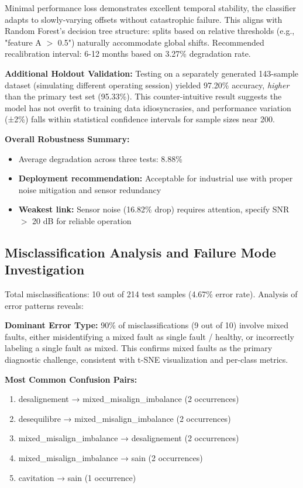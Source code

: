 \documentclass[11pt,a4paper]{article}
\begin{document}
Minimal performance loss demonstrates excellent temporal stability, the classifier adapts to slowly-varying offsets without catastrophic failure. This aligns with Random Forest's decision tree structure: splits based on relative thresholds (e.g., "feature A  $>$  0.5") naturally accommodate global shifts. Recommended recalibration interval: 6-12 months based on 3.27\% degradation rate.

\textbf{Additional Holdout Validation:} Testing on a separately generated 143-sample dataset (simulating different operating session) yielded 97.20\% accuracy, \textit{higher} than the primary test set (95.33\%). This counter-intuitive result suggests the model has not overfit to training data idiosyncrasies, and performance variation (±2\%) falls within statistical confidence intervals for sample sizes near 200.

\textbf{Overall Robustness Summary:}
\begin{itemize}[itemsep=0.3em]
    \item Average degradation across three tests: 8.88\%
    \item \textbf{Deployment recommendation:} Acceptable for industrial use with proper noise mitigation and sensor redundancy
    \item \textbf{Weakest link:} Sensor noise (16.82\% drop) requires attention, specify SNR  $>$  20 dB for reliable operation
\end{itemize}

\subsection{Misclassification Analysis and Failure Mode Investigation}

Total misclassifications: 10 out of 214 test samples (4.67\% error rate). Analysis of error patterns reveals:

\textbf{Dominant Error Type:} 90\% of misclassifications (9 out of 10) involve mixed faults, either misidentifying a mixed fault as single fault / healthy, or incorrectly labeling a single fault as mixed. This confirms mixed faults as the primary diagnostic challenge, consistent with t-SNE visualization and per-class metrics.

\textbf{Most Common Confusion Pairs:}
\begin{enumerate}[itemsep=0.2em]
    \item desalignement → mixed\_misalign\_imbalance (2 occurrences)
    \item desequilibre → mixed\_misalign\_imbalance (2 occurrences)
    \item mixed\_misalign\_imbalance → desalignement (2 occurrences)
    \item mixed\_misalign\_imbalance → sain (2 occurrences)
    \item cavitation → sain (1 occurrence)
\end{enumerate}
\end{document}

